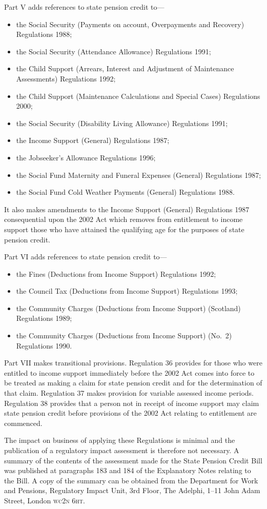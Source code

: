\documentclass[12pt,a4paper]{article}
\begin{document}
Part V adds references to state pension credit to—
\begin{itemize}\item
    the Social Security (Payments on account, Overpayments and Recovery) Regulations 1988;
\item
    the Social Security (Attendance Allowance) Regulations 1991;
\item
    the Child Support (Arrears, Interest and Adjustment of Maintenance Assessments) Regulations 1992;
\item
    the Child Support (Maintenance Calculations and Special Cases) Regulations 2000;
\item
    the Social Security (Disability Living Allowance) Regulations 1991;
\item
    the Income Support (General) Regulations 1987;
\item
    the Jobseeker’s Allowance Regulations 1996;
\item
    the Social Fund Maternity and Funeral Expenses (General) Regulations 1987;
\item
    the Social Fund Cold Weather Payments (General) Regulations 1988. 
\end{itemize}
It also makes amendments to the Income Support (General) Regulations 1987 consequential upon the 2002 Act which removes from entitlement to income support those who have attained the qualifying age for the purposes of state pension credit.

Part VI adds references to state pension credit to—
\begin{itemize}\item
    the Fines (Deductions from Income Support) Regulations 1992;
\item
    the Council Tax (Deductions from Income Support) Regulations 1993;
\item
    the Community Charges (Deductions from Income Support) (Scotland) Regulations 1989;
\item
    the Community Charges (Deductions from Income Support) (No.\ 2) Regulations 1990. 
\end{itemize}

Part VII makes transitional provisions. Regulation 36 provides for those who were entitled to income support immediately before the 2002 Act comes into force to be treated as making a claim for state pension credit and for the determination of that claim. Regulation 37 makes provision for variable assessed income periods. Regulation 38 provides that a person not in receipt of income support may claim state pension credit before provisions of the 2002 Act relating to entitlement are commenced.

The impact on business of applying these Regulations is minimal and the publication of a regulatory impact assessment is therefore not necessary. A summary of the contents of the assessment made for the State Pension Credit Bill was published at paragraphs 183 and 184 of the Explanatory Notes relating to the Bill. A copy of the summary can be obtained from the Department for Work and Pensions, Regulatory Impact Unit, 3rd Floor, The Adelphi, 1–11 John Adam Street, London \textsc{\lowercase{WC2N 6HT}}. 
\end{document}
